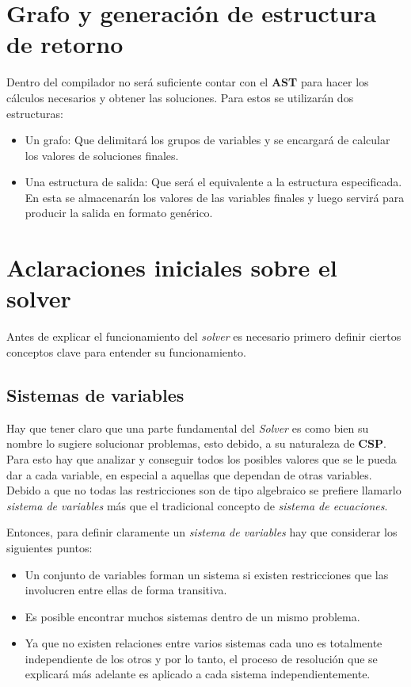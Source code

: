 \section{Grafo y generación de estructura de retorno}
Dentro del compilador no será suficiente contar con el \textbf{AST} para hacer los cálculos 
necesarios y obtener las soluciones. Para estos se utilizarán dos estructuras: 
\begin{itemize}
 \item {Un grafo: Que delimitará los grupos de variables y se encargará de calcular 
	los valores de soluciones finales.}
 \item {Una estructura de salida: Que será el equivalente a la estructura 
	especificada. En esta se almacenarán los valores de las variables finales y 
	luego servirá para producir la salida en formato genérico.}
\end{itemize}


\section{Aclaraciones iniciales sobre el solver}
Antes de explicar el funcionamiento del \emph{solver} es necesario primero definir 
ciertos conceptos clave para entender su funcionamiento.

\subsection{Sistemas de variables}
\label {sis_variables}
Hay que tener claro que una parte fundamental del \emph{Solver} es como bien su nombre 
lo sugiere solucionar problemas, esto debido, a su naturaleza de 
\textbf{CSP}. Para esto hay que analizar y conseguir todos los posibles valores que se le 
pueda dar a cada variable, en especial a aquellas que dependan de otras variables.
Debido a que no todas las restricciones son de tipo algebraico se prefiere 
llamarlo \emph{sistema de variables} más que el tradicional concepto de \emph{sistema de 
ecuaciones}.

Entonces, para definir claramente un \emph{sistema de variables} hay que considerar los
siguientes puntos:

\begin{itemize}
 \item {Un conjunto de variables forman un sistema si existen restricciones que
  las involucren entre ellas de forma transitiva.}
 \item {Es posible encontrar muchos sistemas dentro de un mismo problema.}
 \item {Ya que no existen relaciones entre varios sistemas cada uno es totalmente 
  independiente de los otros y por lo tanto, el proceso de resolución que 	
  se explicará más adelante es aplicado a cada sistema independientemente.}
\end{itemize}

